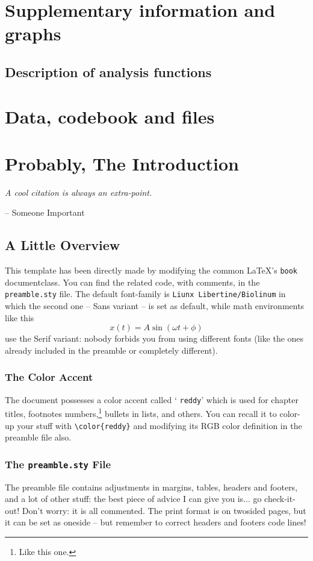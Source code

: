 \documentclass[12pt,a4paper,twoside]{book}
\begin{document}
\appendix

	\chapter{Supplementary information and graphs}
	
\section{Description of analysis functions}
	
	\chapter{Data, codebook and files}

	\chapter*{Probably, The Introduction} 
	\epigraph{\it A cool citation is always an extra-point.}{-- Someone Important}
	\minitoc
\section*{A Little Overview}
This template has been directly made by modifying the common \LaTeX 's {\color{reddy} \verb|book|} documentclass. You can find the related code, with comments, in the {\color{reddy} \verb|preamble.sty|} file. The default font-family is {\color{reddy} \verb|Liunx Libertine/Biolinum|} in which the second one -- Sans variant -- is set as default, while math environments like this
$$x(t)=A\sin(\omega t + \phi)$$
use the Serif variant: nobody forbids you from using different fonts (like the ones already included in the preamble or completely different).
\subsection*{The Color Accent}
The document possesses a color accent called ‘{\color{reddy} \verb|reddy|}’ which is used for chapter titles, footnotes numbers,\footnote{Like this one.} bullets in lists, and others. You can recall it to color-up your stuff with {\color{reddy} \verb|\color{reddy}|} and modifying its RGB color definition in the preamble file also.

\subsection*{The \texttt{preamble.sty} File}
The preamble file contains adjustments in margins, tables, headers and footers, and a lot of other stuff: the best piece of advice I can give you is... {\color{reddy} go check-it-out}! Don't worry: it is all commented. The print format is on twosided pages, but it can be set as oneside -- but remember to correct headers and footers code lines!
\end{document}
